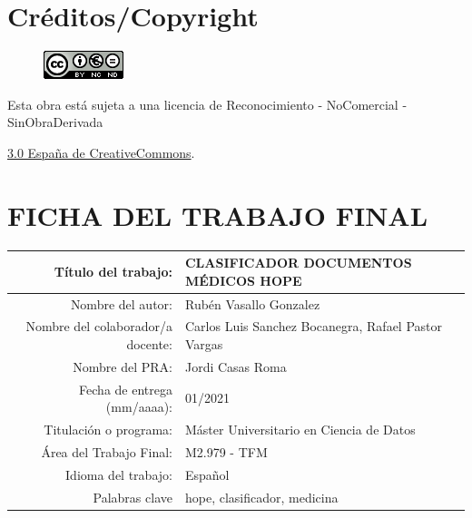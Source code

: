\setcounter{page}{1} 
\pagestyle{plain}

\chapter*{Créditos/Copyright}

\vspace{1cm}

\begin{figure}[ht]
    \centering
	\includegraphics[scale=1]{images/license.png}
\end{figure}

Esta obra está sujeta a una licencia de Reconocimiento -  NoComercial - SinObraDerivada

\href{https://creativecommons.org/licenses/by-nc-nd/3.0/es/}{3.0 España de CreativeCommons}.

\chapter*{FICHA DEL TRABAJO FINAL}

\begin{table}[ht]
	\centering{}
	\renewcommand{\arraystretch}{2}
	\begin{tabular}{r | l}
		\hline
		Título del trabajo: & CLASIFICADOR DOCUMENTOS MÉDICOS HOPE\\
		\hline
        Nombre del autor: & Rubén Vasallo Gonzalez\\
		\hline
        Nombre del colaborador/a docente: & Carlos Luis Sanchez Bocanegra, Rafael Pastor Vargas \\
		\hline
        Nombre del PRA: & Jordi Casas Roma \\
		\hline
        Fecha de entrega (mm/aaaa): & 01/2021\\
		\hline
        Titulación o programa: & Máster Universitario en Ciencia de Datos\\
		\hline
        Área del Trabajo Final: & M2.979 - TFM\\
		\hline
        Idioma del trabajo: & Español\\
		\hline
        Palabras clave & hope, clasificador, medicina\\
		\hline
	\end{tabular}
\end{table}

